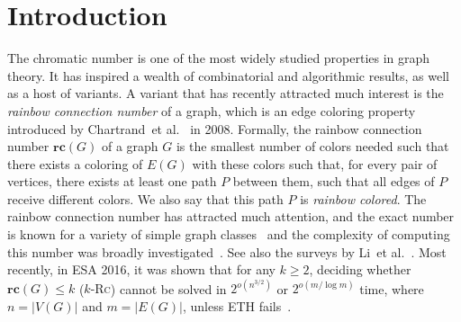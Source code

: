 \documentclass[letter,runningheads,envcountsame,envcountsect]{llncs}
\newcommand{\vsrc}{\mathbf{vsrc}}
\newcommand{\src}{\mathbf{src}}
\newcommand{\rc}{\mathbf{rc}}
\newcommand{\etal}{et al.}
\begin{document}
\begin{abstract}
\end{abstract}

\section{Introduction} \label{sec:intro}
The chromatic number is one of the most widely studied properties in graph theory. It has inspired a wealth of combinatorial and algorithmic results, as well as a host of variants. A variant that has recently attracted much interest is the \emph{rainbow connection number} of a graph, which is an edge coloring property introduced by Chartrand~\etal~\cite{chartrandrainbow} in 2008. Formally, the rainbow connection number $\rc(G)$ of a graph $G$ is the smallest number of colors needed such that there exists a coloring of $E(G)$ with these colors such that, for every pair of vertices, there exists at least one path $P$ between them, such that all edges of $P$ receive different colors. We also say that this path $P$ is \emph{rainbow colored}. The rainbow connection number has attracted much attention, and the exact number is known for a variety of simple graph classes~\cite{chartrandrainbow,chandran2012rainbow,sunil2012rainbow} and the complexity of computing this number was broadly investigated~\cite{ananth2011rainbow,basavaraju2014rainbow,chakraborty2011hardness,chandran2012rainbow,chandran2013inapproximability}. See also the surveys by Li~\etal~\cite{srcli,li2012rainbow,li2017}. Most recently, in ESA 2016, it was shown that for any $k \geq 2$, deciding whether $\rc(G)\le k$ (\textsc{$k$-Rc}) cannot be solved in $2^{o(n^{3/2})}$ or $2^{o(m/\log m)}$ time, where $n = |V(G)|$ and $m = |E(G)|$, unless ETH fails~\cite{Lauri-esa}.
\end{document}
